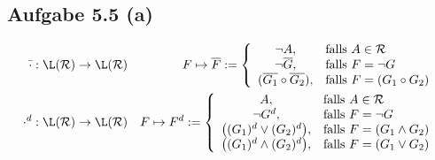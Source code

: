 \documentclass[12pt,a4paper]{article}
\newcommand{\RR}{\mathcal{R}}
\begin{document}
\subsection*{Aufgabe 5.5 (a)}
\begin{align*}
\bar{\cdot}&:\L(\RR)\to\L(\RR) &F\mapsto\overline{F}:=\left\lbrace\begin{array}{cl}
\neg A, &\falls A\in\RR\\
\neg\overline{G}, &\falls F=\neg G\\
(\overline{G_1}\circ\overline{G_2}), &\falls F=(G_1\circ G_2)
\end{array}\right.\\
\cdot^d&:\L(\RR)\to\L(\RR) &F\mapsto F^d:=\left\lbrace\begin{array}{cl}
A, &\falls A\in\RR\\
\neg G^d, &\falls F=\neg G\\
\big((G_1)^d\vee(G_2)^d\big), &\falls F=(G_1\wedge G_2)\\
\big((G_1)^d\wedge(G_2)^d\big), &\falls F=(G_1\vee G_2)
\end{array}\right.\\
\end{align*}
\end{document}
